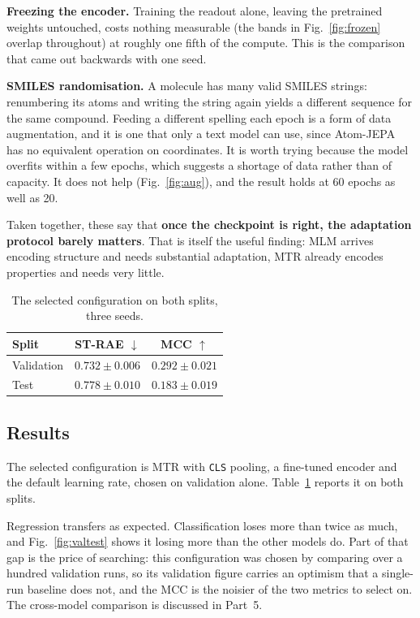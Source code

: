\documentclass[10pt,twocolumn,a4paper]{article}
\begin{document}
\textbf{Freezing the encoder.} Training the readout alone, leaving the
pretrained weights untouched, costs nothing measurable (the bands in
Fig.~\ref{fig:frozen} overlap throughout) at roughly one fifth of the
compute. This is the comparison that came out backwards with one seed.

\textbf{SMILES randomisation.} A molecule has many valid SMILES
strings: renumbering its atoms and writing the string again yields a
different sequence for the same compound. Feeding a different spelling
each epoch is a form of data augmentation, and it is one that only a
text model can use, since Atom-JEPA has no equivalent operation on
coordinates. It is worth trying because the model overfits within a few
epochs, which suggests a shortage of data rather than of capacity.
It does not help (Fig.~\ref{fig:aug}), and the result holds at 60
epochs as well as 20.

Taken together, these say that \textbf{once the checkpoint is right,
the adaptation protocol barely matters}. That is itself the useful
finding: MLM arrives encoding structure and needs substantial
adaptation, MTR already encodes properties and needs very little.

\FloatBarrier

\begin{table}[t]
  \centering
  \caption{The selected configuration on both splits, three seeds.}
  \label{tab:final}
  \begin{tabular}{lcc}
    \toprule
    Split & ST-RAE $\downarrow$ & MCC $\uparrow$ \\
    \midrule
    Validation & $0.732 \pm 0.006$ & $0.292 \pm 0.021$ \\
    Test       & $0.778 \pm 0.010$ & $0.183 \pm 0.019$ \\
    \bottomrule
  \end{tabular}
\end{table}

\subsection{Results}

The selected configuration is MTR with \texttt{CLS} pooling, a
fine-tuned encoder and the default learning rate, chosen on validation
alone. Table~\ref{tab:final} reports it on both splits.

Regression transfers as expected. Classification loses more than twice
as much, and Fig.~\ref{fig:valtest} shows it losing more than the other
models do. Part of that gap is the price of searching: this
configuration was chosen by comparing over a hundred validation runs,
so its validation figure carries an optimism that a single-run baseline
does not, and the MCC is the noisier of the two metrics to select on.
The cross-model comparison is discussed in Part~5.
\end{document}
